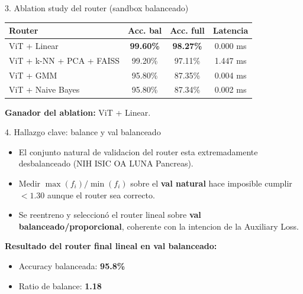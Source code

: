 \documentclass[aspectratio=169,11pt]{beamer}
\begin{document}
\begin{frame}{3. Ablation study del router (sandbox balanceado)}
\small
\begin{tabularx}{\textwidth}{Yccc}
\toprule
\textbf{Router} & \textbf{Acc. bal} & \textbf{Acc. full} & \textbf{Latencia} \\
\midrule
ViT + Linear & \textbf{99.60\%} & \textbf{98.27\%} & 0.000 ms \\
ViT + k-NN + PCA + FAISS & 99.20\% & 97.11\% & 1.447 ms \\
ViT + GMM & 95.80\% & 87.35\% & 0.004 ms \\
ViT + Naive Bayes & 95.80\% & 87.34\% & 0.002 ms \\
\bottomrule
\end{tabularx}

\vspace{0.2cm}
\textbf{Ganador del ablation:} ViT + Linear.
\end{frame}

\begin{frame}{4. Hallazgo clave: balance y val balanceado}
\begin{itemize}
  \item El conjunto natural de validacion del router esta extremadamente desbalanceado (NIH \gg ISIC \gg OA \gg LUNA \gg Pancreas).
  \item Medir $\max(f_i)/\min(f_i)$ sobre el \textbf{val natural} hace imposible cumplir $<1.30$ aunque el router sea correcto.
  \item Se reentreno y seleccionó el router lineal sobre \textbf{val balanceado/proporcional}, coherente con la intencion de la Auxiliary Loss.
\end{itemize}

\vspace{0.2cm}
\textbf{Resultado del router final lineal en val balanceado:}
\begin{itemize}
  \item Accuracy balanceada: \textbf{95.8\%}
  \item Ratio de balance: \textbf{1.18} 
\end{itemize}
\end{frame}
\end{document}
